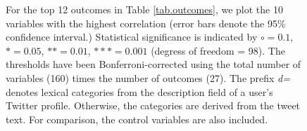 \begin{figure}
\begin{subfigure}[b]{0.33\textwidth}
\label{fig.physicallyunhealthydays}
\end{subfigure}
\caption{For the top 12 outcomes in Table \ref{tab.outcomes}, we plot the 10 variables with the highest correlation (error bars denote the 95\% confidence interval.) Statistical significance is indicated by $\circ = 0.1$, $\ast = 0.05$, $\ast\ast = 0.01$, $\ast\ast\ast = 0.001$ (degress of freedom = 98). The thresholds have been Bonferroni-corrected using the total number of variables (160) times the number of outcomes (27). The prefix {\sl d=} denotes lexical categories from the description field of a user's Twitter profile. Otherwise, the categories are derived from the tweet text. For comparison, the control variables are also included. \label{fig.words} }
 \end{figure}